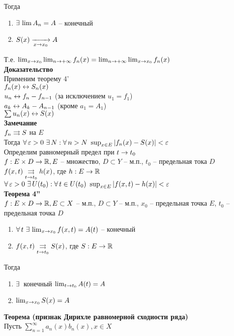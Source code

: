 \documentclass[12pt]{article}
\begin{document}
Тогда \begin{enumerate}
    \item $\exists\, \lim A_n = A$ -- конечный
    \item $S(x)\xrightarrow[x\rightarrow x_0]{} A$
\end{enumerate}
Т.е. $\lim_{x\rightarrow x_0} \lim_{n\rightarrow +\infty} f_n(x) =  \lim_{n\rightarrow +\infty} \lim_{x\rightarrow x_0} f_n(x)$\\
\textbf{Доказательство}\\
Применим теорему 4'\\
$f_n(x) \leftrightarrow S_n(x)$\\
$u_n \leftrightarrow f_n-f_{n-1}$ (за исключением $u_1 = f_1$)\\
$a_k \leftrightarrow A_k - A_{n-1}$ (кроме $a_1 = A_1$)\\
$\sum u_n(x) \leftrightarrow S(x)$\\
\textbf{Замечание}\\
$f_n \rightrightarrows S$ на $E$\\
Тогда $\forall\, \varepsilon > 0\ \exists\, N: \forall\, n > N\ \sup_{x\in E}|f_n(x)-S(x)|<\varepsilon$\\
Определим равномерный предел при $t\rightarrow t_0$\\
$f: E \times D\rightarrow \mathbb{R}, E$ -- множество, $D\subset Y$ -- м.п., $t_0$ -- предельная тока $D$\\
$f(x, t) \underset{t\rightarrow t_0}{\rightrightarrows} h(x)$, где $h: E\rightarrow\mathbb{R}$\\
$\forall\, \varepsilon > 0\ \exists\, U(t_0): \forall\, t \in U(t_0)\ \sup_{x\in E}|f(x,t)-h(x)| < \varepsilon$\\
\textbf{Теорема 4''}\\
$f: E\times D \rightarrow \mathbb{R}, E \subset X$ -- м.п., $D\subset Y$ -- м.п., $x_0$ -- предельная точка $E$, $t_0$ -- предельная точка $D$
\begin{enumerate}
    \item $\forall\, t\ \exists\, \lim_{x\rightarrow x_0} f(x,t) = A(t)$ -- конечный
    \item $f(x,t) \underset{t\rightarrow t_0}{\rightrightarrows} S(x)$, где $S: E\rightarrow \mathbb{R}$
\end{enumerate}
Тогда \begin{enumerate}
    \item $\exists\,$ конечный $\lim_{t\rightarrow t_0} A(t) = A$
    \item $\lim_{x\rightarrow x_0} S(x) = A$
\end{enumerate}
\textbf{Теорема (признак Дирихле равномерной сходиости ряда)}\\
Пусть $\sum_{n=1}^{\infty} a_n(x)b_n(x), x \in X$\\
\end{document}
